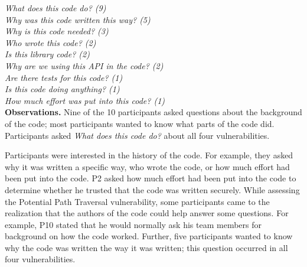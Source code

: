 \documentclass[conference]{IEEEtran}
\begin{document}
\noindent\emph{What does this code do? (9)} \\
\emph{Why was this code written this way? (5)} \\
\emph{Why is this code needed? (3)} \\
\emph{Who wrote this code? (2)} \\
\emph{Is this library code? (2)} \\
\emph{Why are we using this API in the code? (2)} \\
\emph{Are there tests for this code? (1)} \\
\emph{Is this code doing anything? (1)} \\
\emph{How much effort was put into this code? (1)} \\



\noindent\textbf{Observations.}
Nine of the 10 participants asked questions about the background of the code; most participants wanted to know what parts of the code did.
Participants asked \textit{What does this code do?} about all four vulnerabilities.

Participants were interested in the history of the code.
For example, they asked why it was written a specific way, who wrote the code, or how much effort had been put into the code.
P2 asked how much effort had been put into the code to determine whether he trusted that the code was written securely.
While assessing the Potential Path Traversal vulnerability, some participants came to the realization that the authors of the code could help answer some questions. 
For example, P10 stated that he would normally ask his team members for background on how the code worked.
Further, five participants wanted to know why the code was written the way it was written; this question occurred in all four vulnerabilities.
\\

\end{document}

